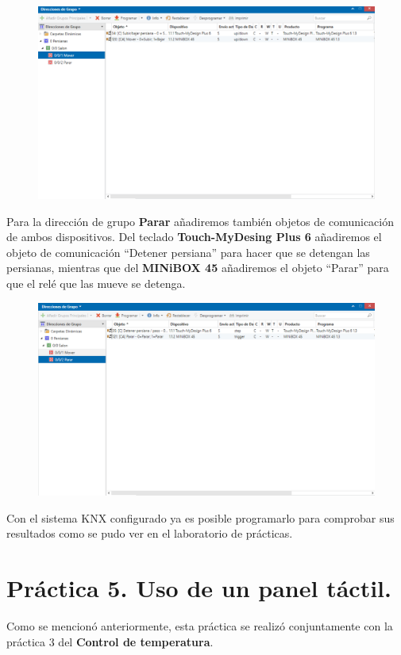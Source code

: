 \documentclass[10pt]{article}
\begin{document}
\begin{figure}[H]
	\begin{center}
	 		\includegraphics[width = 1.00\textwidth]{Imagenes/img42}
	\end{center} 
\end{figure}

Para la dirección de grupo \textbf{Parar} añadiremos también objetos de comunicación de ambos dispositivos. Del teclado \textbf{Touch-MyDesing Plus 6} añadiremos el objeto de comunicación ``Detener persiana'' para hacer que se detengan las persianas, mientras que del \textbf{MINiBOX 45} añadiremos el objeto ``Parar'' para que el relé que las mueve se detenga. \\
 
 
 \begin{figure}[H]
	\begin{center}
	 		\includegraphics[width = 1.00\textwidth]{Imagenes/img43}
	\end{center} 
\end{figure}

Con el sistema KNX configurado ya es posible programarlo para comprobar sus resultados como se pudo ver en el laboratorio de prácticas.\\


\section{Práctica 5. Uso de un panel táctil.} 
Como se mencionó anteriormente, esta práctica se realizó conjuntamente con la práctica 3 del \textbf{Control de temperatura}.\\
\end{document}
